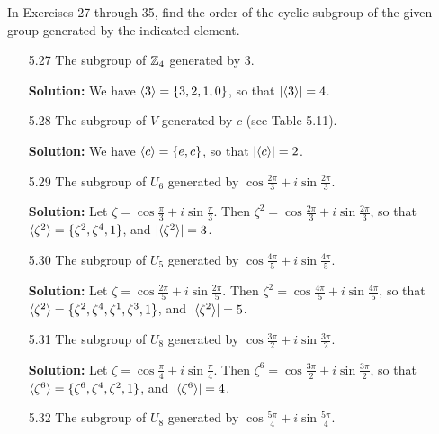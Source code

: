 \noindent      In Exercises 27 through 35, find the order of the cyclic subgroup
               of the given group generated by the indicated element.

\begin{enumerate}
   \item[5.27] The subgroup of $\mathbb{Z}_4$ generated by 3.

      \textbf{Solution:} We have $\langle 3 \rangle = \{3, 2, 1, 0\}$, so that
      $|\langle 3 \rangle| = 4$.
   \item[5.28] The subgroup of $V$ generated by $c$ (see Table 5.11).

      \textbf{Solution:} We have $\langle c \rangle = \{e, c\}$, so that $|\langle c \rangle| = 2$.
   \item[5.29] The subgroup of $U_6$ generated by
               $\cos\frac{2\pi}{3} + i\sin\frac{2\pi}{3}$.

      \textbf{Solution:} Let $\zeta = \cos\frac{\pi}{3} + i\sin\frac{\pi}{3}$.
      Then $\zeta^2 = \cos\frac{2\pi}{3} + i\sin\frac{2\pi}{3}$, so that
      $\langle \zeta^2 \rangle = \{\zeta^2, \zeta^4, 1\}$, and $|\langle \zeta^2 \rangle| = 3$.
   \item[5.30] The subgroup of $U_5$ generated by
               $\cos\frac{4\pi}{5} + i\sin\frac{4\pi}{5}$.

      \textbf{Solution:} Let $\zeta = \cos\frac{2\pi}{5} + i\sin\frac{2\pi}{5}$.
      Then $\zeta^2 = \cos\frac{4\pi}{5} + i\sin\frac{4\pi}{5}$, so that
      $\langle \zeta^2 \rangle = \{\zeta^2, \zeta^4, \zeta^1, \zeta^3, 1\}$, and
      $|\langle \zeta^2 \rangle| = 5$.
   \item[5.31] The subgroup of $U_8$ generated by
               $\cos\frac{3\pi}{2} + i\sin\frac{3\pi}{2}$.

      \textbf{Solution:} Let $\zeta = \cos\frac{\pi}{4} + i\sin\frac{\pi}{4}$.
      Then $\zeta^{6} = \cos\frac{3\pi}{2} + i\sin\frac{3\pi}{2}$, so that
      $\langle \zeta^6 \rangle = \{\zeta^6, \zeta^4, \zeta^2, 1\}$, and
      $|\langle \zeta^6 \rangle| = 4$.
   \item[5.32] The subgroup of $U_8$ generated by
               $\cos\frac{5\pi}{4} + i\sin\frac{5\pi}{4}$.


\end{enumerate}
